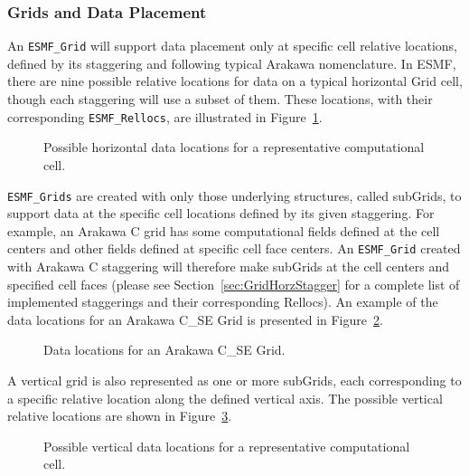\subsubsection{Grids and Data Placement}
\label{sec:GridDataPlacement}
An {\tt ESMF\_Grid} will support data placement only at specific cell relative
locations, defined by its staggering and following typical Arakawa nomenclature.
In ESMF, there are nine possible relative locations for data on a typical
horizontal Grid cell, though each staggering will use a subset of them.  These
locations, with their corresponding {\tt ESMF\_Rellocs}, are illustrated in
Figure~\ref{fig:GridDataLocations}.

\begin{center}
\begin{figure}[h!tb]
\caption{Possible horizontal data locations for a representative computational
cell. }
\label{fig:GridDataLocations}
\end{figure}
\end{center}

{\tt ESMF\_Grids} are created with only those underlying structures, called
subGrids, to support data at the specific cell locations defined by its given
staggering.  For example, an Arakawa C grid has some computational fields
defined at the cell centers and other fields defined at specific cell face
centers.  An {\tt ESMF\_Grid} created with Arakawa C staggering will therefore
make subGrids at the cell centers and specified cell faces (please see
Section~\ref{sec:GridHorzStagger} for a complete list of implemented staggerings
and their corresponding Rellocs).  An example of the data locations for an
Arakawa C\_SE Grid is presented in Figure~\ref{fig:ArakawaC_SE}.

\begin{center}
\begin{figure}[h!tb]
\caption{Data locations for an Arakawa C\_SE Grid. }
\label{fig:ArakawaC_SE}
\end{figure}
\end{center}

A vertical grid is also represented as one or more subGrids, each corresponding
to a specific relative location along the defined vertical axis.  The possible
vertical relative locations are shown in Figure~\ref{fig:VertGridDataLocations}.

\begin{center}
\begin{figure}[h!tb]
\caption{Possible vertical data locations for a representative computational
         cell. }
\label{fig:VertGridDataLocations}
\end{figure}
\end{center}

